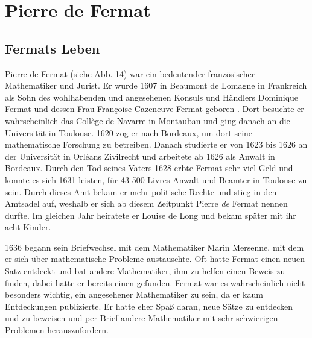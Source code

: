 \documentclass[a4paper,12pt]{article}
\begin{document}
\newpage

\section{Pierre de Fermat}

\subsection{Fermats Leben}

\begin{figwindow}

Pierre de Fermat (siehe Abb. 14) war ein bedeutender französischer Mathematiker und Jurist. Er wurde 1607 \cite{FermatWiki} in Beaumont de Lomagne in Frankreich als Sohn des wohlhabenden und angesehenen Konsuls und Händlers Dominique Fermat und dessen Frau Françoise Cazeneuve Fermat geboren \cite{FermatsLeben} \cite[S. 59-65]{Buch}. Dort besuchte er wahrscheinlich das Collège de Navarre in Montauban und ging danach an die Universität in Toulouse. 1620 zog er nach Bordeaux, um dort seine mathematische Forschung zu betreiben. Danach studierte er von 1623 bis 1626 an der Universität in Orléans Zivilrecht \cite{FermatsLebenundSatz} und arbeitete ab 1626 als Anwalt in Bordeaux. Durch den Tod seines Vaters 1628 erbte Fermat sehr viel Geld und konnte es sich 1631 leisten, für 43 500 Livres Anwalt und Beamter in Toulouse zu sein. Durch dieses Amt bekam er mehr politische Rechte und stieg in den Amtsadel auf, weshalb er sich ab diesem Zeitpunkt Pierre \textit{de} Fermat nennen durfte. Im gleichen Jahr heiratete er Louise de Long und bekam später mit ihr acht Kinder.

\end{figwindow}

1636 begann sein Briefwechsel mit dem Mathematiker Marin Mersenne, mit dem er sich über mathematische Probleme austauschte. Oft hatte Fermat einen neuen Satz entdeckt und bat andere Mathematiker, ihm zu helfen einen Beweis zu finden, dabei hatte er bereits einen gefunden. Fermat war es wahrscheinlich nicht besonders wichtig, ein angesehener Mathematiker zu sein, da er kaum Entdeckungen publizierte. Er hatte eher Spaß daran, neue Sätze zu entdecken und zu beweisen und per Brief andere Mathematiker mit sehr schwierigen Problemen herauszufordern.
\end{document}
